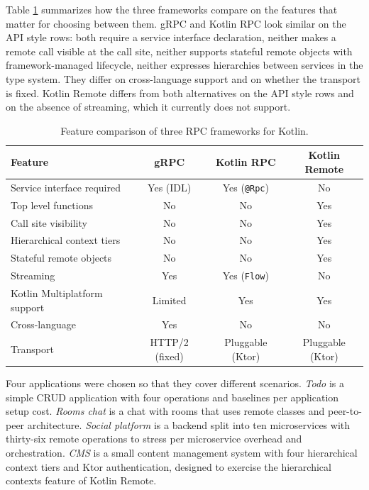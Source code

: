 \documentclass[a4paper,11pt,oneside]{article}
\newcommand{\term}[1]{\textit{#1}}
\newcommand{\kotlini}[1]{\texttt{#1}}
\begin{document}
Table \ref{features_table} summarizes how the three frameworks compare on the features that
matter for choosing between them. gRPC and Kotlin RPC look similar on the API style rows: both
require a service interface declaration, neither makes a remote call visible at the call site,
neither supports stateful remote objects with framework-managed lifecycle, neither expresses
hierarchies between services in the type system. They differ on cross-language support and on 
whether the transport is fixed. Kotlin Remote differs from both
alternatives on the API style rows and on the absence of streaming, which it currently does not
support.

\begin{table}[!h]
	\begin{center}
		\begin{tabular}{lccc}
			\toprule
			Feature                      & gRPC                  & Kotlin RPC           & Kotlin Remote    \\
			\midrule
			Service interface required   & Yes (IDL)             & Yes (\kotlini{@Rpc}) & No               \\
			Top level functions          & No                    & No                   & Yes              \\
			Call site visibility         & No                    & No                   & Yes              \\
			Hierarchical context tiers   & No                    & No                   & Yes              \\
			Stateful remote objects      & No                    & No                   & Yes              \\
			Streaming                    & Yes                   & Yes (\kotlini{Flow}) & No               \\
			Kotlin Multiplatform support & Limited               & Yes                  & Yes              \\
			Cross-language               & Yes                   & No                   & No               \\
			Transport                    & HTTP/2 (fixed)        & Pluggable (Ktor)     & Pluggable (Ktor) \\
			\bottomrule
		\end{tabular}
		\caption{Feature comparison of three RPC frameworks for Kotlin.}\label{features_table}
	\end{center}
\end{table}

Four applications were chosen so that they cover different scenarios. \term{Todo} is a simple
CRUD application with four operations and baselines per application setup cost. \term{Rooms
chat} is a chat with rooms that uses remote classes and peer-to-peer architecture. \term{Social
platform} is a backend split into ten microservices with thirty-six remote operations to stress
per microservice overhead and orchestration. \term{CMS} is a small content management system
with four hierarchical context tiers and Ktor authentication, designed to exercise the
hierarchical contexts feature of Kotlin Remote.
\end{document}
